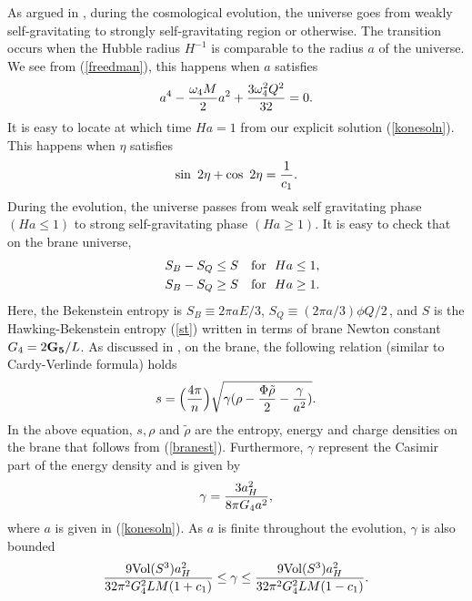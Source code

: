 \documentclass[a4paper,11pt]{article}
\begin{document}
As argued in \cite{EV}, during the cosmological evolution, the  universe
goes from weakly  self-gravitating to strongly self-gravitating region or
otherwise. The  transition occurs  when the Hubble radius $H^{-1}$ is
comparable to the radius $a$ of the  universe. We see from
(\ref{freedman}), this happens when $a$ satisfies
%
\begin{equation}
a^4 - {\omega_4 M\over 2} a^2 + {3 \omega_4^2 Q^2 \over{32}} = 0.
\label{clocus}
\end{equation}
It is easy to locate at which time $Ha =1$ from our explicit solution 
(\ref{konesoln}). This happens when $\eta$ satisfies
\begin{equation}
\sin~2 \eta + \cos~2\eta  = {1\over{c_1}}.
\end{equation}
During the evolution, the universe passes from 
weak self gravitating phase $(Ha \le 1)$ to strong self-gravitating phase 
$(Ha \ge 1)$. It is easy to check that on the brane universe, 
\begin{eqnarray} 
&&S_B - S_Q \le S ~~~{\rm for} ~~ Ha \le 1, \nonumber\\
&&S_B - S_Q \ge S ~~~{\rm for} ~~ Ha \ge 1.
\label{entb}
\end{eqnarray}
Here, the Bekenstein entropy is $S_B \equiv 2\pi a E/3$, $S_Q \equiv (2\pi
a/3) \phi  Q/2\,$, and $S$ is the Hawking-Bekenstein entropy (\ref{st})
written  in terms of brane Newton constant $G_4 = 2 {\bf G_5}/L$. As
discussed in  \cite{BM}, on the brane, the following relation (similar to
Cardy-Verlinde  formula) holds
\begin{equation}
s = \Big({4 \pi\over n}\Big) \sqrt {\gamma (\rho - {\Phi \tilde \rho\over 
2} - {\gamma\over {a^2}})}.
\label{cv}
\end{equation}
In the above equation, $s, \rho $ and $\tilde \rho$ are the entropy, 
energy and charge densities on the brane that follows from 
(\ref{branest}). Furthermore, 
$\gamma$ represent the Casimir part of the energy density \cite{SV}
and is given by 
\begin{equation}
\gamma = {3 a_H^2\over{8\pi G_4 a^2}},
\label{ce}
\end{equation}
where $a$ is given in (\ref{konesoln}). As $a$ is finite throughout the 
evolution, $\gamma$ is also bounded
\begin{equation}
{9 {\rm Vol}(S^3) a_H^2 \over{ 32 \pi^2 G_4^2 L M(1+c_1)}} \le 
\gamma
\le {9 {\rm Vol}(S^3) a_H^2 \over{ 32 \pi^2 G_4^2 L M (1-c_1)}}.
\end{equation}
\end{document}
